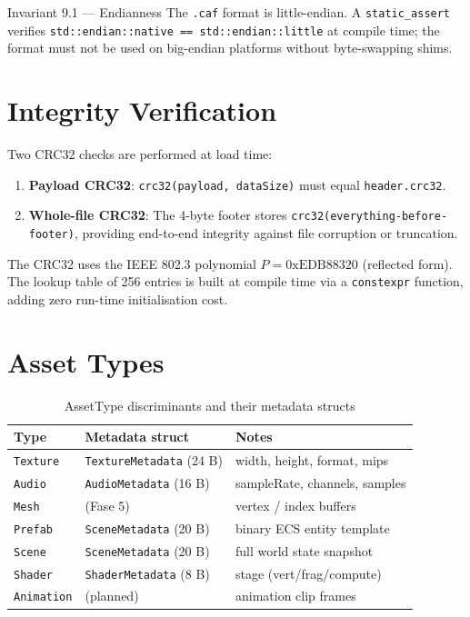 \documentclass[12pt, a4paper]{report}
\theoremstyle{definition}
\theoremstyle{remark}
\begin{document}
\begin{specbox}{Invariant 9.1 — Endianness}
  The \texttt{.caf} format is little-endian.
  A \texttt{static\_assert} verifies \texttt{std::endian::native == std::endian::little}
  at compile time; the format must not be used on big-endian platforms
  without byte-swapping shims.
\end{specbox}

\section{Integrity Verification}

Two CRC32 checks are performed at load time:
\begin{enumerate}
  \item \textbf{Payload CRC32}: \texttt{crc32(payload, dataSize)} must equal
        \texttt{header.crc32}.
  \item \textbf{Whole-file CRC32}: The 4-byte footer stores
        \texttt{crc32(everything-before-footer)}, providing end-to-end
        integrity against file corruption or truncation.
\end{enumerate}

The CRC32 uses the IEEE 802.3 polynomial $P = 0\text{xEDB88320}$
(reflected form). The lookup table of 256 entries is built at
compile time via a \texttt{constexpr} function, adding zero run-time
initialisation cost.

\section{Asset Types}

\begin{table}[H]
\centering
\caption{AssetType discriminants and their metadata structs}
\begin{tabular}{lll}
\toprule
\textbf{Type} & \textbf{Metadata struct} & \textbf{Notes} \\
\midrule
\texttt{Texture}   & \texttt{TextureMetadata} (24 B)  & width, height, format, mips \\
\texttt{Audio}     & \texttt{AudioMetadata} (16 B)    & sampleRate, channels, samples \\
\texttt{Mesh}      & (Fase 5)                         & vertex / index buffers \\
\texttt{Prefab}    & \texttt{SceneMetadata} (20 B)    & binary ECS entity template \\
\texttt{Scene}     & \texttt{SceneMetadata} (20 B)    & full world state snapshot \\
\texttt{Shader}    & \texttt{ShaderMetadata} (8 B)    & stage (vert/frag/compute) \\
\texttt{Animation} & (planned)                        & animation clip frames \\
\bottomrule
\end{tabular}
\end{table}
\end{document}

